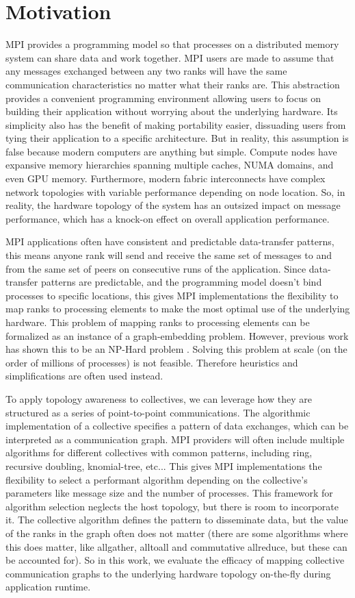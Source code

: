 \section{Motivation}
MPI provides a programming model so that processes on a distributed memory system can share data and work together.
MPI users are made to assume that any messages exchanged between any two ranks will have the same communication characteristics no matter what their ranks are. 
This abstraction provides a convenient programming environment allowing users to focus on building their application without worrying about the underlying hardware. 
Its simplicity also has the benefit of making portability easier, dissuading users from tying their application to a specific architecture.
But in reality, this assumption is false because modern computers are anything but simple. 
Compute nodes have expansive memory hierarchies spanning multiple caches, NUMA domains, and even GPU memory.
Furthermore, modern fabric interconnects have complex network topologies with variable performance depending on node location.
So, in reality, the hardware topology of the system has an outsized impact on message performance, which has a knock-on effect on overall application performance. 

MPI applications often have consistent and predictable data-transfer patterns, this means anyone rank will send and receive the same set of messages to and from the same set of peers on consecutive runs of the application.
Since data-transfer patterns are predictable, and the programming model doesn't bind processes to specific locations, this gives MPI implementations the flexibility to map ranks to processing elements to make the most optimal use of the underlying hardware.
This problem of mapping ranks to processing elements can be formalized as an instance of a graph-embedding problem. However, previous work has shown this to be an NP-Hard problem \cite{Hoefler2011GenericTopoMappingStrats}. 
Solving this problem at scale (on the order of millions of processes) is not feasible. Therefore heuristics and simplifications are often used instead.

To apply topology awareness to collectives, we can leverage how they are structured as a series of point-to-point communications.
The algorithmic implementation of a collective specifies a pattern of data exchanges, which can be interpreted as a communication graph.
MPI providers will often include multiple algorithms for different collectives with common patterns, including ring, recursive doubling, knomial-tree, etc...
This gives MPI implementations the flexibility to select a performant algorithm depending on the collective's parameters like message size and the number of processes.
This framework for algorithm selection neglects the host topology, but there is room to incorporate it.
The collective algorithm defines the pattern to disseminate data, but the value of the ranks in the graph often  does not matter (there are some algorithms where this does matter, like allgather, alltoall and commutative allreduce, but these can be accounted for).
So in this work, we evaluate the efficacy of mapping collective communication graphs to the underlying hardware topology on-the-fly during application runtime.


